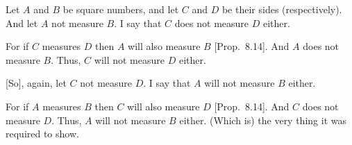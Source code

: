 \begin{Parallel}{}{}
{Let $A$ and $B$ be square numbers, and let $C$ and $D$ be their
sides (respectively). And let $A$ not measure $B$. I say that  $C$ does not measure $D$ either.

For if $C$ measures $D$ then $A$ will also measure $B$
[Prop.~8.14]. And $A$ does not measure $B$. Thus,
$C$ will not measure $D$ either.

\mbox{[}So], again,  let $C$ not measure $D$. I say that $A$ will not measure $B$
either.

For if $A$ measures $B$ then $C$ will also measure $D$ [Prop.~8.14]. And $C$ does not measure $D$.
Thus, $A$ will not measure $B$ either. (Which is) the very thing it was required to show.}
\end{Parallel}

